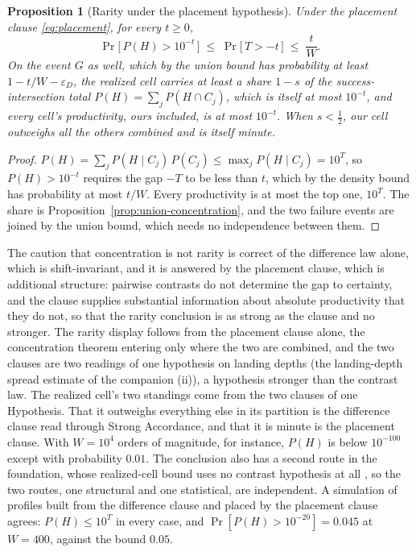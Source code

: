 \documentclass[11pt]{article}
\newtheorem{proposition}{Proposition}
\theoremstyle{definition}
\begin{document}
\begin{proposition}[Rarity under the placement hypothesis]
\label{prop:concentration-rarity}
Under the placement clause \eqref{eq:placement}, for every $t \ge 0$,
\begin{equation}
\label{eq:rarity}
\Pr\big[\, P(H) > 10^{-t} \,\big] \;\le\; \Pr\big[\, T > -t \,\big] \;\le\; \frac{t}{W}.
\end{equation}
On the event $G$ as well, which by the union bound has probability at least $1 - t/W - \varepsilon_D$, the realized cell carries at least a share $1 - s$ of the success-intersection total $P(H) = \sum_j P(H \cap C_j)$, which is itself at most $10^{-t}$, and every cell's productivity, ours included, is at most $10^{-t}$. When $s < \tfrac12$, our cell outweighs all the others combined and is itself minute.
\end{proposition}
\begin{proof}
$P(H) = \sum_j P(H \mid C_j)\, P(C_j) \le \max_j P(H \mid C_j) = 10^{T}$, so $P(H) > 10^{-t}$ requires the gap $-T$ to be less than $t$, which by the density bound has probability at most $t/W$. Every productivity is at most the top one, $10^{T}$. The share is Proposition~\ref{prop:union-concentration}, and the two failure events are joined by the union bound, which needs no independence between them.
\end{proof}

\noindent The caution that concentration is not rarity is correct of the difference law alone, which is shift-invariant, and it is answered by the placement clause, which is additional structure: pairwise contrasts do not determine the gap to certainty, and the clause supplies substantial information about absolute productivity that they do not, so that the rarity conclusion is as strong as the clause and no stronger. The rarity display follows from the placement clause alone, the concentration theorem entering only where the two are combined, and the two clauses are two readings of one hypothesis on landing depths (the landing-depth spread estimate of the companion \cite{Nexus}(ii)), a hypothesis stronger than the contrast law. The realized cell's two standings come from the two clauses of one Hypothesis. That it outweighs everything else in its partition is the difference clause read through Strong Accordance, and that it is minute is the placement clause. With $W = 10^{4}$ orders of magnitude, for instance, $P(H)$ is below $10^{-100}$ except with probability $0.01$. The conclusion also has a second route in the foundation, whose realized-cell bound uses no contrast hypothesis at all \cite{Nexus}, so the two routes, one structural and one statistical, are independent. A simulation of profiles built from the difference clause and placed by the placement clause agrees: $P(H) \le 10^{T}$ in every case, and $\Pr[P(H) > 10^{-20}] = 0.045$ at $W = 400$, against the bound $0.05$.
\end{document}
